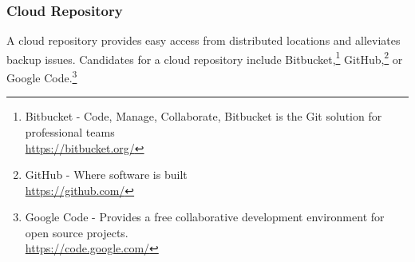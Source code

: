 
\subsubsection{Cloud Repository}
A cloud repository provides easy access from distributed
locations and alleviates backup issues.  Candidates for
a cloud repository include Bitbucket,\footnote{Bitbucket - Code, Manage, Collaborate,
Bitbucket is the Git solution for professional teams\\
\href{https://bitbucket.org/}{https://bitbucket.org/}}
GitHub,\footnote{GitHub - Where software is built\\
\href{https://github.com/}{https://github.com/}}
or Google Code.\footnote{Google Code - Provides a free collaborative development environment
for open source projects.\\
\href{https://code.google.com/}{https://code.google.com/}}


